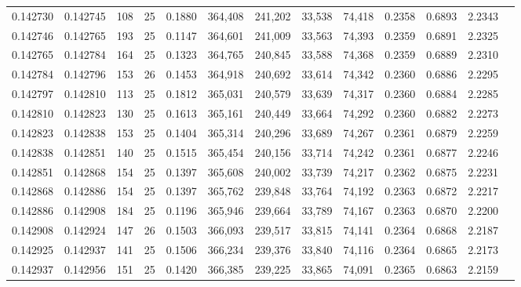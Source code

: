 \begin{tabular}{rrrrrrrrrrrrr}
0.142730 & 0.142745 &   108 &  25 &                                     0.1880 & 364,408 & 241,202 &  33,538 &  74,418 & 0.2358 & 0.6893 & 2.2343 \\
0.142746 & 0.142765 &   193 &  25 &                                     0.1147 & 364,601 & 241,009 &  33,563 &  74,393 & 0.2359 & 0.6891 & 2.2325 \\
0.142765 & 0.142784 &   164 &  25 &                                     0.1323 & 364,765 & 240,845 &  33,588 &  74,368 & 0.2359 & 0.6889 & 2.2310 \\
0.142784 & 0.142796 &   153 &  26 &                                     0.1453 & 364,918 & 240,692 &  33,614 &  74,342 & 0.2360 & 0.6886 & 2.2295 \\
0.142797 & 0.142810 &   113 &  25 &                                     0.1812 & 365,031 & 240,579 &  33,639 &  74,317 & 0.2360 & 0.6884 & 2.2285 \\
0.142810 & 0.142823 &   130 &  25 &                                     0.1613 & 365,161 & 240,449 &  33,664 &  74,292 & 0.2360 & 0.6882 & 2.2273 \\
0.142823 & 0.142838 &   153 &  25 &                                     0.1404 & 365,314 & 240,296 &  33,689 &  74,267 & 0.2361 & 0.6879 & 2.2259 \\
0.142838 & 0.142851 &   140 &  25 &                                     0.1515 & 365,454 & 240,156 &  33,714 &  74,242 & 0.2361 & 0.6877 & 2.2246 \\
0.142851 & 0.142868 &   154 &  25 &                                     0.1397 & 365,608 & 240,002 &  33,739 &  74,217 & 0.2362 & 0.6875 & 2.2231 \\
0.142868 & 0.142886 &   154 &  25 &                                     0.1397 & 365,762 & 239,848 &  33,764 &  74,192 & 0.2363 & 0.6872 & 2.2217 \\
0.142886 & 0.142908 &   184 &  25 &                                     0.1196 & 365,946 & 239,664 &  33,789 &  74,167 & 0.2363 & 0.6870 & 2.2200 \\
0.142908 & 0.142924 &   147 &  26 &                                     0.1503 & 366,093 & 239,517 &  33,815 &  74,141 & 0.2364 & 0.6868 & 2.2187 \\
0.142925 & 0.142937 &   141 &  25 &                                     0.1506 & 366,234 & 239,376 &  33,840 &  74,116 & 0.2364 & 0.6865 & 2.2173 \\
0.142937 & 0.142956 &   151 &  25 &                                     0.1420 & 366,385 & 239,225 &  33,865 &  74,091 & 0.2365 & 0.6863 & 2.2159 \\

\end{tabular}
